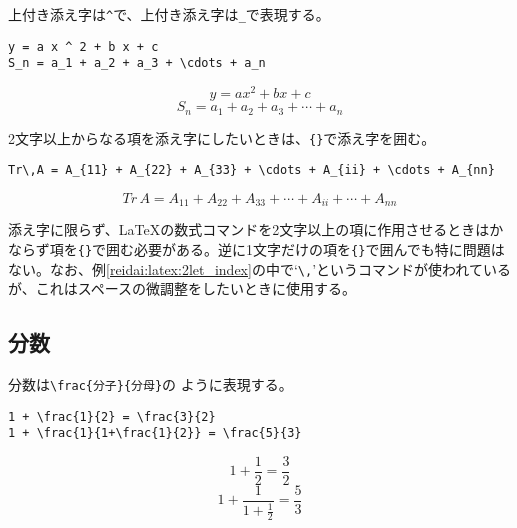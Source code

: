 上付き添え字は\texttt{\^}で、上付き添え字は\texttt{\_}で表現する。
\begin{reidai}
\begin{verbatim}
y = a x ^ 2 + b x + c
S_n = a_1 + a_2 + a_3 + \cdots + a_n
\end{verbatim}
\end{reidai}
\vspace*{-1.5em}
\begin{kekka}
  \begin{equation*}
    y = a x ^ 2 + b x + c
  \end{equation*}
  \begin{equation*}
    S_n = a_1 + a_2 + a_3 + \cdots + a_n
  \end{equation*}
  \vspace{0pt}
\end{kekka} \noindent
2文字以上からなる項を添え字にしたいときは、\verb|{}|で添え字を囲む。
\begin{reidai}
\label{reidai:latex:2let_index}
\begin{verbatim}
Tr\,A = A_{11} + A_{22} + A_{33} + \cdots + A_{ii} + \cdots + A_{nn}
\end{verbatim}
\end{reidai}
\vspace*{-1.5em}
\begin{kekka}
  \begin{equation*}
    Tr\,A = A_{11} + A_{22} + A_{33} + \cdots + A_{ii} + \cdots + A_{nn}
  \end{equation*}
  \vspace{0pt}
\end{kekka} \noindent
添え字に限らず、\LaTeX の数式コマンドを2文字以上の項に作用させるときはかならず項を\verb|{}|で囲む必要がある。逆に1文字だけの項を\verb|{}|で囲んでも特に問題はない。なお、例\ref{reidai:latex:2let_index}の中で`\verb|\,|'というコマンドが使われているが、これはスペースの微調整をしたいときに使用する。

\subsection{分数}
\label{sec:latex:frac}

分数は\texttt{\textbackslash frac\{\textrm{分子}\}\{\textrm{分母}\}}の
ように表現する。
\begin{reidai}
\begin{verbatim}
1 + \frac{1}{2} = \frac{3}{2}
1 + \frac{1}{1+\frac{1}{2}} = \frac{5}{3}
\end{verbatim}
\end{reidai}
\vspace*{-1.5em}
\begin{kekka}
  \begin{equation*}
    1 + \frac{1}{2} = \frac{3}{2}
  \end{equation*}
  \begin{equation*}
    1 + \frac{1}{1+\frac{1}{2}} = \frac{5}{3}
  \end{equation*}
\end{kekka}


